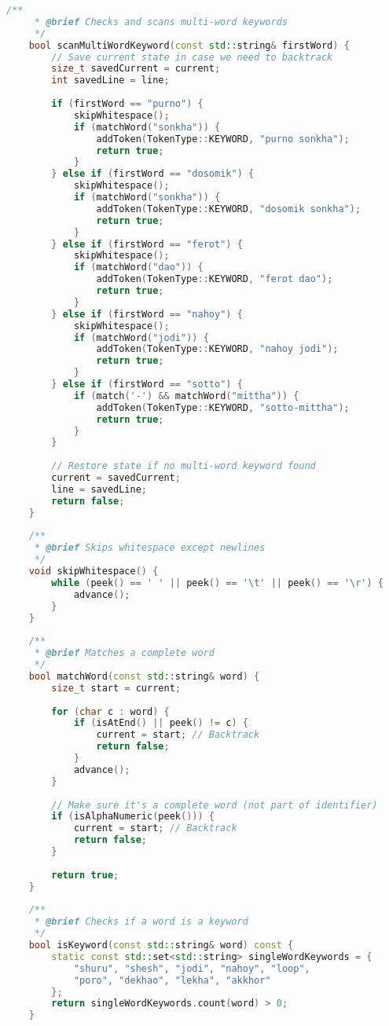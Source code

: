 \documentclass[12pt,a4paper]{article}
\begin{document}
\begin{lstlisting}[language=C++, caption=Lexical Analyzer Implementation]
    /**
     * @brief Checks and scans multi-word keywords
     */
    bool scanMultiWordKeyword(const std::string& firstWord) {
        // Save current state in case we need to backtrack
        size_t savedCurrent = current;
        int savedLine = line;
        
        if (firstWord == "purno") {
            skipWhitespace();
            if (matchWord("sonkha")) {
                addToken(TokenType::KEYWORD, "purno sonkha");
                return true;
            }
        } else if (firstWord == "dosomik") {
            skipWhitespace();
            if (matchWord("sonkha")) {
                addToken(TokenType::KEYWORD, "dosomik sonkha");
                return true;
            }
        } else if (firstWord == "ferot") {
            skipWhitespace();
            if (matchWord("dao")) {
                addToken(TokenType::KEYWORD, "ferot dao");
                return true;
            }
        } else if (firstWord == "nahoy") {
            skipWhitespace();
            if (matchWord("jodi")) {
                addToken(TokenType::KEYWORD, "nahoy jodi");
                return true;
            }
        } else if (firstWord == "sotto") {
            if (match('-') && matchWord("mittha")) {
                addToken(TokenType::KEYWORD, "sotto-mittha");
                return true;
            }
        }
        
        // Restore state if no multi-word keyword found
        current = savedCurrent;
        line = savedLine;
        return false;
    }
    
    /**
     * @brief Skips whitespace except newlines
     */
    void skipWhitespace() {
        while (peek() == ' ' || peek() == '\t' || peek() == '\r') {
            advance();
        }
    }
    
    /**
     * @brief Matches a complete word
     */
    bool matchWord(const std::string& word) {
        size_t start = current;
        
        for (char c : word) {
            if (isAtEnd() || peek() != c) {
                current = start; // Backtrack
                return false;
            }
            advance();
        }
        
        // Make sure it's a complete word (not part of identifier)
        if (isAlphaNumeric(peek())) {
            current = start; // Backtrack
            return false;
        }
        
        return true;
    }
    
    /**
     * @brief Checks if a word is a keyword
     */
    bool isKeyword(const std::string& word) const {
        static const std::set<std::string> singleWordKeywords = {
            "shuru", "shesh", "jodi", "nahoy", "loop", 
            "poro", "dekhao", "lekha", "akkhor"
        };
        return singleWordKeywords.count(word) > 0;
    }
    

\end{lstlisting}
\end{document}
